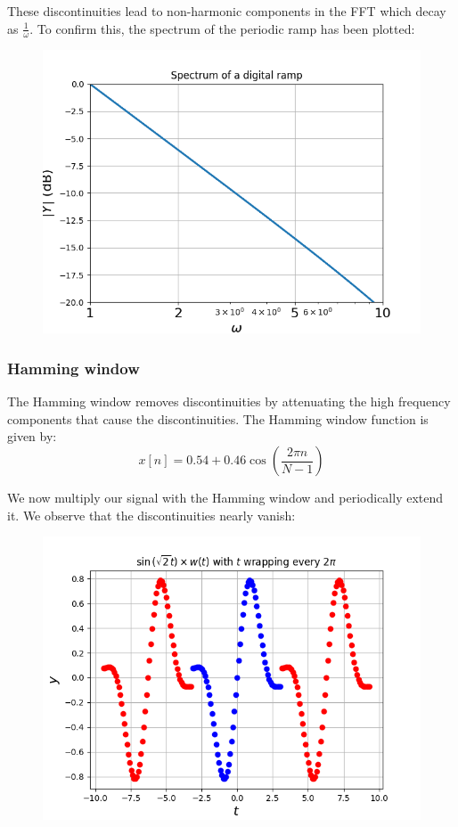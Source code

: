 \documentclass[12pt, a4paper]{article}
\begin{document}
These discontinuities lead to non-harmonic components in the FFT which decay as $\frac{1}{\omega}$.
To confirm this, the spectrum of the periodic ramp has been plotted:
\begin{figure}[H]
    \centering
    \includegraphics[scale=0.65]{eg4.png}
\end{figure}


\subsubsection{Hamming window}
The Hamming window removes discontinuities by attenuating the high frequency components that cause the discontinuities.
The Hamming window function is given by:
\begin{equation*}
    x[n] = 0.54 + 0.46\cos(\frac{2\pi n}{N - 1})
\end{equation*}

We now multiply our signal with the Hamming window and periodically extend it. We observe that the discontinuities nearly vanish:
\begin{figure}[H]
    \centering
    \includegraphics[scale=0.65]{eg5.png}
\end{figure}
\end{document}
